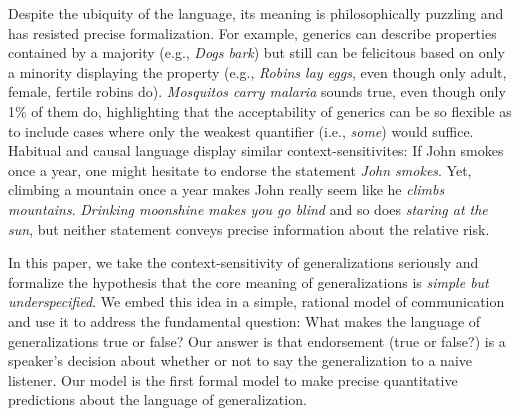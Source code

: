 \documentclass[11pt,letterpaper]{letter} %
\begin{document}
\begin{letter}
Despite the ubiquity of the language, its meaning is philosophically puzzling and has resisted precise formalization. 
For example, generics can describe properties contained by a majority (e.g., \emph{Dogs bark}) but still can be felicitous based on only a minority displaying the property (e.g., \emph{Robins lay eggs}, even though only adult, female, fertile robins do). 
\emph{Mosquitos carry malaria} sounds true, even though only 1\% of them do, highlighting that the acceptability of generics can be so flexible as to include cases where only the weakest quantifier (i.e., \emph{some}) would suffice. 
Habitual and causal language display similar context-sensitivites:
If John smokes once a year, one might hesitate to endorse the statement \emph{John smokes}.
Yet, climbing a mountain once a year makes John really seem like he \emph{climbs mountains}.
\emph{Drinking moonshine makes you go blind} and so does \emph{staring at the sun}, but neither statement conveys precise information about the relative risk.


In this paper, we take the context-sensitivity of generalizations seriously and formalize the hypothesis that the core meaning of generalizations is \emph{simple but underspecified}. 
We embed this idea in a simple, rational model of communication and use it to address the fundamental question: What makes the language of generalizations true or false?
Our answer is that endorsement (true or false?) is a speaker's decision about whether or not to say the generalization to a naive listener.
Our model is the first formal model to make precise quantitative predictions about the language of generalization.


\end{letter}
\end{document}
